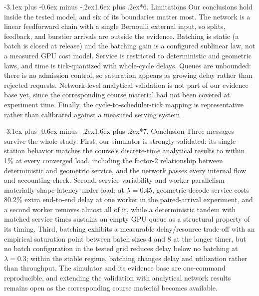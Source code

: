 \documentclass[11pt,a4paper]{article}
\makeatletter
\renewcommand\section{\@startsection{section}{1}{\z@}%
  {-3.1ex plus -0.6ex minus -.2ex}{1.6ex plus .2ex}{\normalfont\Large\bfseries}}
\makeatother
\begin{document}
\section*{6. Limitations}
Our conclusions hold inside the tested model, and six of its boundaries
matter most. The network is a linear feedforward chain with a single
Bernoulli external input, so splits, feedback, and burstier arrivals are
outside the evidence. Batching is static (a batch is closed at release) and
the batching gain is a configured sublinear law, not a measured GPU cost
model. Service is restricted to deterministic and geometric laws, and time
is tick-quantized with whole-cycle delays. Queues are unbounded: there is no
admission control, so saturation appears as growing delay rather than
rejected requests. Network-level analytical validation is not part of our
evidence base yet, since the corresponding course material had not been
covered at experiment time. Finally, the cycle-to-scheduler-tick mapping is
representative rather than calibrated against a measured serving system.

\section*{7. Conclusion}
Three messages survive the whole study. First, our simulator is strongly
validated: its single-station behavior matches the course's discrete-time
analytical results to within 1\% at every converged load, including the
factor-2 relationship between deterministic and geometric service, and the
network passes every internal flow and accounting check. Second, service
variability and worker parallelism materially shape latency under load: at
$\lambda = 0.45$, geometric decode service costs 80.2\% extra end-to-end
delay at one worker in the paired-arrival experiment, and a second worker
removes almost all of it, while a deterministic tandem with matched service
times sustains an empty GPU queue as a structural property of its timing.
Third, batching exhibits a measurable delay/resource trade-off with an
empirical saturation point between batch sizes 4 and 8 at the longer timer,
but no batch configuration in the tested grid reduces delay below no
batching at $\lambda = 0.3$; within the stable regime, batching changes
delay and utilization rather than throughput. The simulator and its evidence
base are one-command reproducible, and extending the validation with
analytical network results remains open as the corresponding course material
becomes available.
\end{document}
